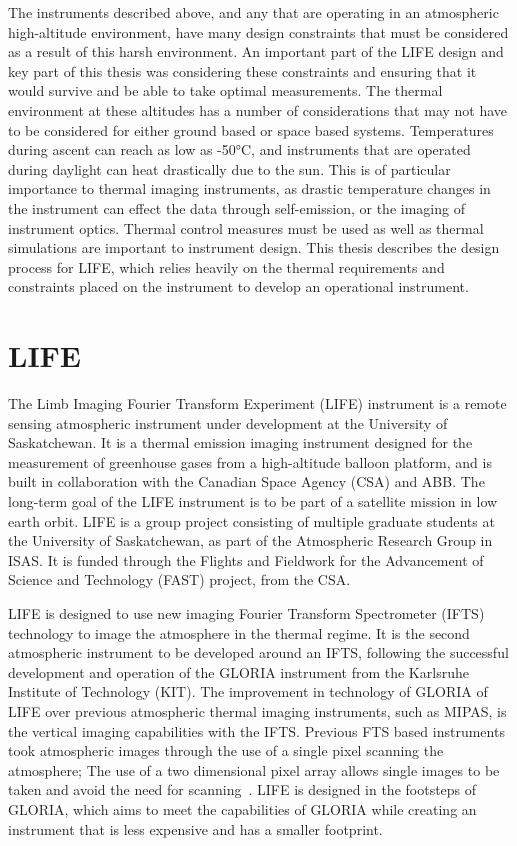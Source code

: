The instruments described above, and any that are operating in an atmospheric high-altitude environment, have many design constraints that must be considered as a result of this harsh environment. An important part of the LIFE design and key part of this thesis was considering these constraints and ensuring that it would survive and be able to take optimal measurements. The thermal environment at these altitudes has a number of considerations that may not have to be considered for either ground based or space based systems. Temperatures during ascent can reach as low as -50°C, and instruments that are operated during daylight can heat drastically due to the sun. This is of particular importance to thermal imaging instruments, as drastic temperature changes in the instrument can effect the data through self-emission, or the imaging of instrument optics. Thermal control measures must be used as well as thermal simulations are important to instrument design. This thesis describes the design process for LIFE, which relies heavily on the thermal requirements and constraints placed on the instrument to develop an operational instrument.

\section{LIFE}
The Limb Imaging Fourier Transform Experiment (LIFE) instrument is a remote sensing atmospheric instrument under development at the University of Saskatchewan. It is a thermal emission imaging instrument designed for the measurement of greenhouse gases from a high-altitude balloon platform, and is built in collaboration with the Canadian Space Agency (CSA) and ABB. The long-term goal of the LIFE instrument is to be part of a satellite mission in low earth orbit. LIFE is a group project consisting of multiple graduate students at the University of Saskatchewan, as part of the Atmospheric Research Group in ISAS. It is funded through the Flights and Fieldwork for the Advancement of Science and Technology (FAST) project, from the CSA. 

LIFE is designed to use new imaging Fourier Transform Spectrometer (IFTS) technology to image the atmosphere in the thermal regime. It is the second atmospheric instrument to be developed around an IFTS, following the successful development and operation of the GLORIA instrument from the Karlsruhe Institute of Technology (KIT). The improvement in technology of GLORIA of LIFE over previous atmospheric thermal imaging instruments, such as MIPAS, is the vertical imaging capabilities with the IFTS. Previous FTS based instruments took atmospheric images through the use of a single pixel scanning the atmosphere; The use of a two dimensional pixel array allows single images to be taken and avoid the need for scanning~\citep{GLORIA_objectives}. LIFE is designed in the footsteps of GLORIA, which aims to meet the capabilities of GLORIA while creating an instrument that is less expensive and has a smaller footprint. 

